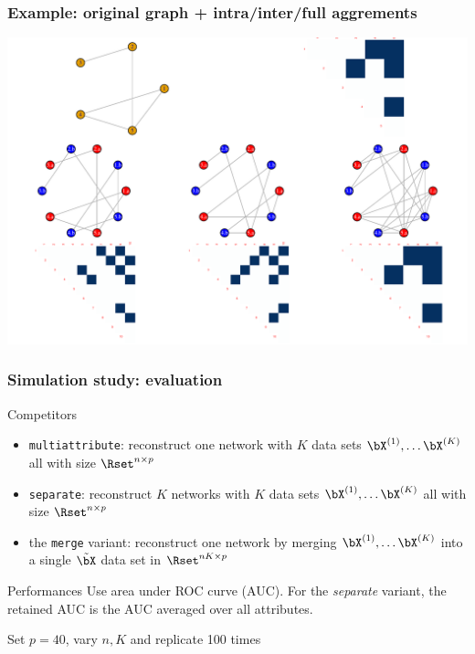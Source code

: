 \documentclass[10pt, c, xcolor=x11names]{beamer}\usepackage[]{graphicx}\usepackage[]{color}
\newenvironment{knitrout}{}{} %
\begin{document}
\begin{frame}[fragile]
\frametitle{Example: original graph + intra/inter/full aggrements}

\begin{knitrout}\scriptsize
{}\color{fgcolor}
\includegraphics[width=\textwidth]{figures/r_example_bivR_net-1} 

\end{knitrout}
\end{frame}

\begin{frame}
  \frametitle{Simulation study: evaluation}

  \begin{block}{Competitors}
  \begin{itemize}
  \item \texttt{multiattribute}: reconstruct one network with
   $K$ data sets $\bX^{(1)}, \dots \bX^{(K)}$ all with size
  $\Rset^{n\times p}$

  \item \texttt{separate}: reconstruct $K$ networks with
   $K$ data sets $\bX^{(1)}, \dots \bX^{(K)}$ all with size
  $\Rset^{n\times p}$

  \item the \texttt{merge} variant: reconstruct one network
    by merging $\bX^{(1)}, \dots \bX^{(K)}$ into a single
    $\tilde\bX$ data set in $\Rset^{nK \times p}$
  \end{itemize}
  \end{block}

  \begin{block}{Performances}
    Use area under ROC curve (AUC). For the \textit{separate} variant, the retained AUC is the AUC
    averaged over all attributes.
  \end{block}

  \rsa Set $p=40$, vary $n, K$ and replicate 100 times

\end{frame}
\end{document}
